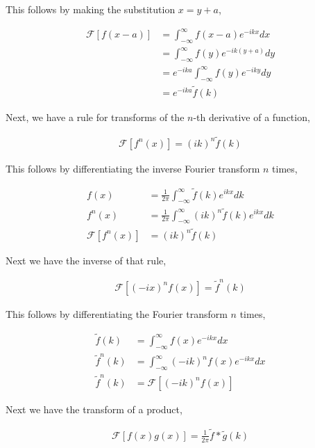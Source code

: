 \documentclass[11pt]{amsart}
\begin{document}
This follows by making the substitution $x = y + a$,

\begin{align*}
  \mathcal{F}\left[f(x-a)\right] &= \int_{-\infty}^{\infty} f(x-a) e^{-ikx} dx \\
                                 &= \int_{-\infty}^{\infty} f(y) e^{-ik(y+a)} dy \\
                                 &= e^{-ika}\int_{-\infty}^{\infty} f(y) e^{-iky}dy \\
                                 &= e^{-ika}\tilde{f}(k)
\end{align*}

Next, we have a rule for transforms of the $n$-th derivative of a function,

\begin{align*}
  \mathcal{F}\left[f^n(x)\right] = {(ik)}^n \tilde{f}(k)
\end{align*}

This follows by differentiating the inverse Fourier transform $n$ times,

\begin{align*}
  f(x) &= \frac{1}{2\pi} \int_{-\infty}^{\infty} \tilde{f}(k) e^{ikx} dk \\
  f^n(x) &= \frac{1}{2\pi} \int_{-\infty}^{\infty} {(ik)}^n \tilde{f}(k) e^{ikx} dk \\
  \mathcal{F}\left[f^n(x)\right] &= {(ik)}^n \tilde{f}(k)
\end{align*}

Next we have the inverse of that rule,

\begin{align*}
  \mathcal{F}\left[{(-ix)}^n f(x)\right] = \tilde{f}^n(k)
\end{align*}

This follows by differentiating the Fourier transform $n$ times,

\begin{align*}
  \tilde{f}(k) &= \int_{-\infty}^{\infty}f(x)e^{-ikx}dx\\
  \tilde{f}^n(k) &= \int_{-\infty}^{\infty}{(-ik)}^nf(x)e^{-ikx} dx \\
  \tilde{f}^n(k) &= \mathcal{F}\left[{(-ik)}^n f(x)\right]
\end{align*}

Next we have the transform of a product,

\begin{align*}
  \mathcal{F}\left[f(x)g(x)\right] = \frac{1}{2\pi} \tilde{f}*\tilde{g}(k)
\end{align*}
\end{document}
